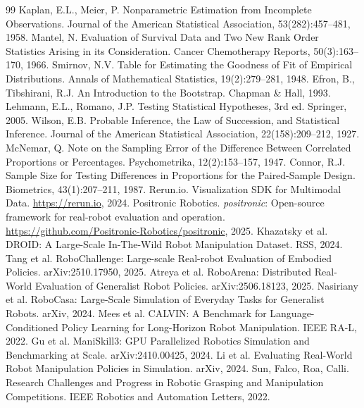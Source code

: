 \documentclass{article}
\begin{document}
\begin{thebibliography}{99}
 Kaplan, E.L., Meier, P. Nonparametric Estimation from Incomplete Observations. Journal of the American Statistical Association, 53(282):457--481, 1958.
 Mantel, N. Evaluation of Survival Data and Two New Rank Order Statistics Arising in its Consideration. Cancer Chemotherapy Reports, 50(3):163--170, 1966.
 Smirnov, N.V. Table for Estimating the Goodness of Fit of Empirical Distributions. Annals of Mathematical Statistics, 19(2):279--281, 1948.
 Efron, B., Tibshirani, R.J. An Introduction to the Bootstrap. Chapman \& Hall, 1993.
 Lehmann, E.L., Romano, J.P. Testing Statistical Hypotheses, 3rd ed. Springer, 2005.
 Wilson, E.B. Probable Inference, the Law of Succession, and Statistical Inference. Journal of the American Statistical Association, 22(158):209--212, 1927.
 McNemar, Q. Note on the Sampling Error of the Difference Between Correlated Proportions or Percentages. Psychometrika, 12(2):153--157, 1947.
 Connor, R.J. Sample Size for Testing Differences in Proportions for the Paired-Sample Design. Biometrics, 43(1):207--211, 1987.
 Rerun.io. Visualization SDK for Multimodal Data. \url{https://rerun.io}, 2024.
 Positronic Robotics. \emph{positronic}: Open-source framework for real-robot evaluation and operation. \url{https://github.com/Positronic-Robotics/positronic}, 2025.
 Khazatsky et al. DROID: A Large-Scale In-The-Wild Robot Manipulation Dataset. RSS, 2024.
 Tang et al. RoboChallenge: Large-scale Real-robot Evaluation of Embodied Policies. arXiv:2510.17950, 2025.
 Atreya et al. RoboArena: Distributed Real-World Evaluation of Generalist Robot Policies. arXiv:2506.18123, 2025.
 Nasiriany et al. RoboCasa: Large-Scale Simulation of Everyday Tasks for Generalist Robots. arXiv, 2024.
 Mees et al. CALVIN: A Benchmark for Language-Conditioned Policy Learning for Long-Horizon Robot Manipulation. IEEE RA-L, 2022.
 Gu et al. ManiSkill3: GPU Parallelized Robotics Simulation and Benchmarking at Scale. arXiv:2410.00425, 2024.
 Li et al. Evaluating Real-World Robot Manipulation Policies in Simulation. arXiv, 2024.
 Sun, Falco, Roa, Calli. Research Challenges and Progress in Robotic Grasping and Manipulation Competitions. IEEE Robotics and Automation Letters, 2022.

\end{thebibliography}
\end{document}
